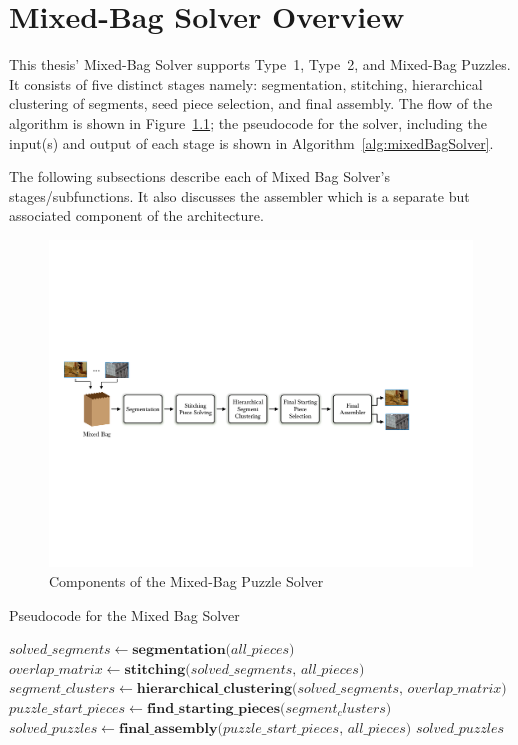 \chapter{Mixed-Bag Solver Overview}

This thesis' Mixed-Bag Solver supports Type~1, Type~2, and Mixed-Bag Puzzles.  It consists of five distinct stages namely: segmentation, stitching, hierarchical clustering of segments, seed piece selection, and final assembly.  The flow of the algorithm is shown in Figure~\ref{fig:multipuzzleSolverArchitecture}; the pseudocode for the solver, including the input(s) and output of each stage is shown in Algorithm~\ref{alg:mixedBagSolver}.

The following subsections describe each of Mixed Bag Solver's stages/subfunctions.  It also discusses the assembler which is a separate but associated component of the architecture.

\begin{figure}[ht!]
	\centering
		\includegraphics[width=1.0\textwidth]{images/cropped_algorithm_structure_overview.pdf}
	\caption{Components of the Mixed-Bag Puzzle Solver}\label{fig:multipuzzleSolverArchitecture}
\end{figure}

\begin{algorithm}
\caption{Pseudocode for the Mixed Bag Solver}\label{alg:mixedBagSolver}
\begin{algorithmic}[1]
    \State $solved\_segments \gets \textbf{segmentation}\text{(} all\_pieces \text{)}$
	\State $overlap\_matrix \gets \textbf{stitching}\text{(} solved\_segments \text{, } all\_pieces \text{)}$
	\State $segment\_clusters \gets \textbf{hierarchical\_clustering} \text{(} solved\_segments \text{, } overlap\_matrix \text{)}$
	\State $puzzle\_start\_pieces \gets \textbf{find\_starting\_pieces} \text{(} segment_clusters \text{)}$
	\State $solved\_puzzles \gets \textbf{final\_assembly} \text{(} puzzle\_start\_pieces \text{, } all\_pieces \text{)}$
    \State \Return $solved\_puzzles$
\EndFunction
\end{algorithmic}
\end{algorithm}

